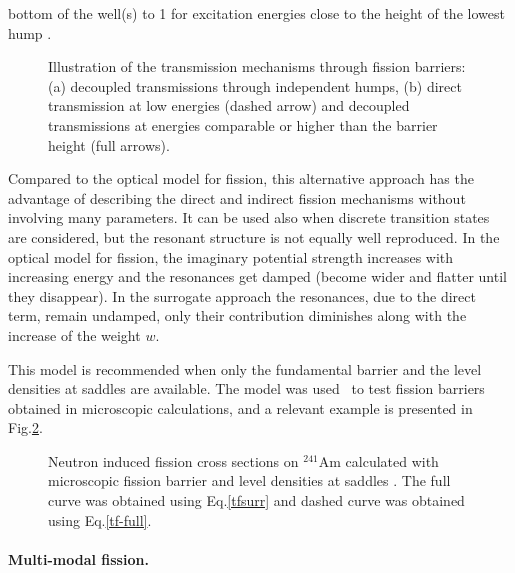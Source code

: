bottom of the well(s) to 1 for excitation energies close to the height of
the lowest hump \cite{Sin:07}.
\begin{figure}[htbp]
\caption{Illustration of the transmission mechanisms through fission
barriers: (a) decoupled transmissions through independent humps, (b) direct
transmission at low energies (dashed arrow) and decoupled transmissions at
energies comparable or higher than the barrier height (full arrows).}
\label{fis-ld0.eps}
\end{figure}
Compared to the optical model for fission, this alternative approach has the
advantage of describing the direct and indirect fission mechanisms without
involving many parameters. It can be used also when discrete transition
states are considered, but the resonant structure is not equally well
reproduced. In the optical model for fission, the imaginary potential
strength increases with increasing energy and the resonances get damped
(become wider and flatter until they disappear). In the surrogate approach
the resonances, due to the direct term, remain undamped, only their
contribution diminishes along with the increase of the weight $w$.

This model is recommended when only the fundamental barrier and the level
densities at saddles are available. The model was used~\cite{Sin:07} to test
fission barriers obtained in microscopic calculations, and a relevant
example is presented in Fig.\ref{am41-surr}.
\begin{figure}[htbp]
\caption{Neutron induced fission cross sections on $^{241}$Am calculated
with microscopic fission barrier \protect\cite{Goriely:07-mass} and level
densities at saddles \protect\cite{Goriely:07-ld}. The full curve was
obtained using Eq.\protect\ref{tfsurr} and dashed curve was obtained using
Eq.\protect\ref{tf-full}.}
\label{am41-surr}
\end{figure}

\medskip %

\paragraph*{Multi-modal fission.}


